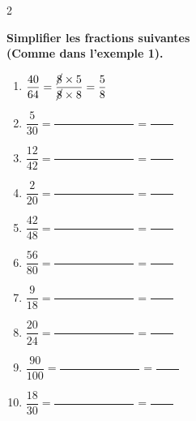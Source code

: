 \documentclass[10pt]{article}
\begin{document}
\begin{multicols}{2}
\begin{exercicedevoir}[5]
  \textbf{Simplifier les fractions suivantes \\(Comme dans l'exemple
  1).}
  \begin{enumerate}
  \item $ \dfrac{40}{64} = \dfrac{\cancel{8} \times
    5}{\cancel{8}\times 8} = \dfrac{5}{8} $
  \item $ \dfrac{5}{30} = \dfrac{\phantom{00000000000000}}{} =
    \dfrac{\phantom{0000}}{} $
  \item $ \dfrac{12}{42} = \dfrac{\phantom{00000000000000}}{} =
    \dfrac{\phantom{0000}}{} $
  \item $ \dfrac{2}{20} = \dfrac{\phantom{00000000000000}}{} =
    \dfrac{\phantom{0000}}{} $
  \item $ \dfrac{42}{48} = \dfrac{\phantom{00000000000000}}{} =
    \dfrac{\phantom{0000}}{} $
  \item $ \dfrac{56}{80} = \dfrac{\phantom{00000000000000}}{} =
    \dfrac{\phantom{0000}}{} $
  \item $ \dfrac{9}{18} = \dfrac{\phantom{00000000000000}}{} =
    \dfrac{\phantom{0000}}{} $
  \item $ \dfrac{20}{24} = \dfrac{\phantom{00000000000000}}{} =
    \dfrac{\phantom{0000}}{} $
  \item $ \dfrac{90}{100} = \dfrac{\phantom{00000000000000}}{} =
    \dfrac{\phantom{0000}}{} $
  \item $ \dfrac{18}{30} = \dfrac{\phantom{00000000000000}}{} =
    \dfrac{\phantom{0000}}{} $
  \end{enumerate}
\end{exercicedevoir}
\end{multicols}
\end{document}

